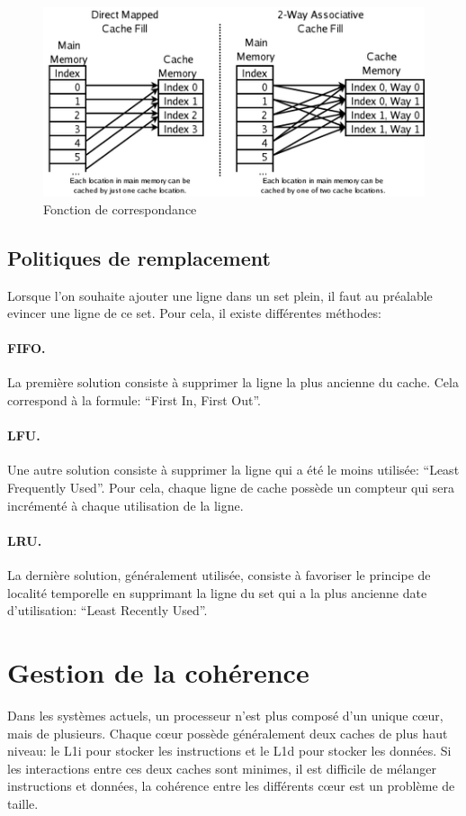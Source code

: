 \documentclass[a4paper]{article}
\begin{document}
\begin{figure}[!h]
\begin{center}
   \includegraphics[scale=0.60]{associative.png}
   \caption{\label{associative} Fonction de correspondance}
\end{center}
\end{figure}

\subsection{Politiques de remplacement}
\indent Lorsque l'on souhaite ajouter une ligne dans un set plein, il faut au préalable evincer une ligne de ce set. Pour cela, il existe différentes méthodes:

\paragraph{FIFO.} La première solution consiste à supprimer la ligne la plus ancienne du cache. Cela correspond à la formule: ``First In, First Out''.

\paragraph{LFU.} Une autre solution consiste à supprimer la ligne qui a été le moins utilisée: ``Least Frequently Used''. Pour cela, chaque ligne de cache possède un compteur qui sera incrémenté à chaque utilisation de la ligne. 

\paragraph{LRU.} La dernière solution, généralement utilisée, consiste à favoriser le principe de localité temporelle en supprimant la ligne du set qui a la plus ancienne date d'utilisation: ``Least Recently Used''.

\newpage
\section{Gestion de la cohérence}
\indent Dans les systèmes actuels, un processeur n'est plus composé d'un unique c{\oe}ur, mais de plusieurs. Chaque c{\oe}ur possède généralement deux caches de plus haut niveau: le L1i pour stocker les instructions et le L1d pour stocker les données. Si les interactions entre ces deux caches sont minimes, il est difficile de mélanger instructions et données, la cohérence entre les différents c{\oe}ur est un problème de taille.
\end{document}
